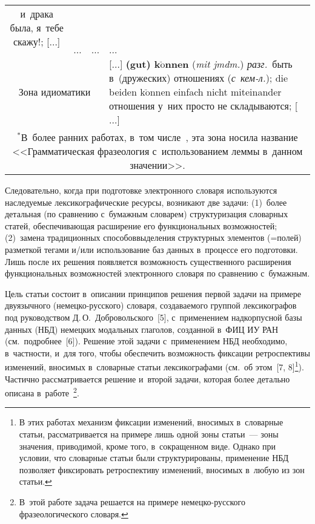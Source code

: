 \begin{multicols}{2}
\begin{table*}
\begin{center}
\begin{tabular}{|c|c|c|p{70mm}|}
и~драка была, я~тебе скажу!; [$\ldots$]\\
\cline{2-4}
&$\ldots$&$\ldots$&$\ldots$\\
\hline
\multicolumn{3}{|c|}{Зона идиоматики}&[$\ldots$] \textbf{(gut) k$\ddot{\mbox{o}}$nnen} 
(\textit{mit jmdm.}) \textit{разг.}\ быть в~(дружеских) отношениях (\textit{с~кем-л.}); die 
beiden k$\ddot{\mbox{o}}$nnen einfach nicht miteinander отношения у~них просто не 
складываются; [$\ldots$]\\
\hline
\multicolumn{4}{p{150mm}}{\footnotesize \hspace*{2mm}$^*$В~более ранних работах, 
в~том числе~\cite{9-gz, 10-gz}, эта зона носила название <<Грамматическая фразеология 
с~использованием леммы в~данном значении>>.}
\end{tabular}
\end{center}
\vspace*{-5pt}
\end{table*}
  
  Следовательно, когда при подготовке электронного словаря используются 
наследуемые лексикографические ресурсы, возникают две задачи:\linebreak
(1)~более 
детальная (по сравнению с~бумажным словарем) структуризация словарных 
статей, обес\-пе\-чи\-ва\-ющая расширение его функциональных возможностей; 
(2)~замена традиционных способов\linebreak выделения структурных элементов 
(=\;по\-лей) разметкой тегами и/или использование баз данных в~процессе его 
подготовки. 
Лишь после их решения появляется возможность существенного 
расширения функциональных возможностей электронного словаря по 
сравнению с~бумажным.
  
Цель статьи состоит в~описании принципов решения первой задачи на примере двуязычного 
(не\-мец\-ко-рус\-ско\-го) словаря, создаваемого группой лексикографов под руководством Д.\,О.~Доб\-ро\-вольского~[5], 
с~применением надкорпусной базы данных (НБД) немецких модальных глаголов, созданной в~ФИЦ ИУ РАН 
(см.\ подробнее~[6]). Решение этой задачи с~применением НБД необходимо, в~частности, и~для того, чтобы 
обеспечить возможность фиксации ретроспективы изменений, вносимых в~словарные статьи 
лексикографами (см.\ об этом~[7, 8]\footnote{В этих работах механизм фиксации изменений, вносимых 
в~словарные статьи, рассматривается на примере лишь одной зоны статьи~--- зоны значения, приводимой, 
кроме того, в~сокращенном виде. Однако при условии, что словарные статьи были структурированы, 
применение НБД позволяет фиксировать ретроспективу изменений, вносимых в~любую из зон статьи.}). 
Частично рассматривается решение и~второй задачи, которая более детально описана  
в~работе~\cite{4-gz}\footnote{В~этой работе задача решается на примере немецко-русского 
фразеологического словаря.}.



\end{multicols}
